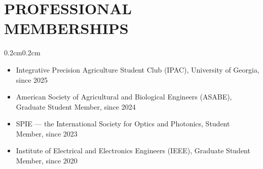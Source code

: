 \documentclass[10pt, letterpaper]{article}
\newenvironment{highlights}{%
    \begin{itemize}[topsep=0.08cm, parsep=0.08cm, partopsep=0pt,
                    itemsep=0pt, leftmargin=0.4cm + 10pt]
}{\end{itemize}}
\newenvironment{onecolentry}{%
    \begin{adjustwidth}{0.2cm}{0.2cm}
}{\end{adjustwidth}}
\begin{document}
\section{PROFESSIONAL MEMBERSHIPS}
\vspace{0.08cm}
\begin{onecolentry}
    \begin{highlights}
        \item Integrative Precision Agriculture Student Club (IPAC),
              University of Georgia, since 2025
        \item American Society of Agricultural and Biological Engineers (ASABE),
              Graduate Student Member, since 2024
        \item SPIE --- the International Society for Optics and Photonics,
              Student Member, since 2023
        \item Institute of Electrical and Electronics Engineers (IEEE),
              Graduate Student Member, since 2020
    \end{highlights}
\end{onecolentry}
\vspace{0.10cm}

\end{document}
